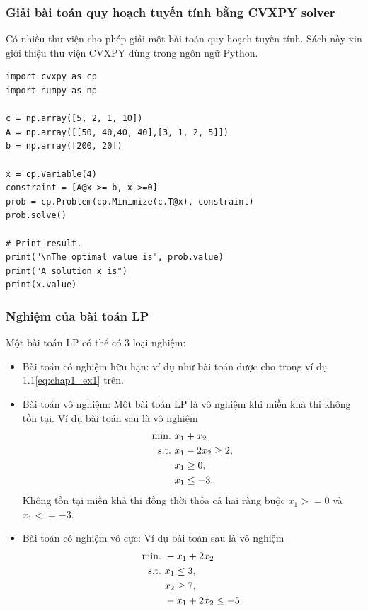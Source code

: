 \documentclass{book}
\begin{document}
\subsubsection{Giải bài toán quy hoạch tuyến tính bằng CVXPY solver}
Có nhiều thư viện cho phép giải một bài toán quy hoạch tuyến tính. Sách này xin giới thiệu thư viện CVXPY dùng trong ngôn ngữ Python.
 
\begin{lstlisting}[frame=single]
import cvxpy as cp
import numpy as np

c = np.array([5, 2, 1, 10])
A = np.array([[50, 40,40, 40],[3, 1, 2, 5]])
b = np.array([200, 20])

x = cp.Variable(4)
constraint = [A@x >= b, x >=0]
prob = cp.Problem(cp.Minimize(c.T@x), constraint)
prob.solve()

# Print result.
print("\nThe optimal value is", prob.value)
print("A solution x is")
print(x.value)

\end{lstlisting}

\subsubsection{Nghiệm của bài toán LP}
Một bài toán LP có thể có 3 loại nghiệm:
\begin{itemize}
\item Bài toán có nghiệm hữu hạn: ví dụ như bài toán được cho trong ví dụ 1.1\eqref{eq:chap1_ex1} trên.

\item Bài toán vô nghiệm:
Một bài toán LP là vô nghiệm khi miền khả thi không tồn tại.
Ví dụ bài toán sau là vô nghiệm
	\begin{align*}
		\rm{min.}~ & x_1+x_2 \\
		\rm{s.t.}~ & x_1-2x_2 \geq 2,\\
			&	x_1 \geq 0,\\ 
			&	x_1 \leq -3.		
	\end{align*}
Không tồn tại miền khả thi đồng thời thỏa cả hai ràng buộc $x_1 >=0$ và $x_1 <= -3$.

\item Bài toán có nghiệm vô cực:
Ví dụ bài toán sau là vô nghiệm
	\begin{align*}
		\rm{min.}~ & -x_1+2x_2 \\
		\rm{s.t.}~ & x_1 \leq 3,\\
			&	x_2 \geq 7,\\ 
			&	-x_1+2x_2 \leq -5.		
	\end{align*}
\end{itemize}
\end{document}
